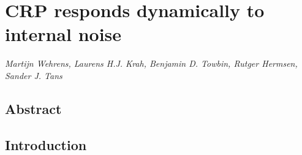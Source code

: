 



% 
%
% 



\chapter{CRP responds dynamically to internal noise}
\label{chapter:CRP}

\textit{Martijn Wehrens, Laurens H.J. Krah, Benjamin D. Towbin, Rutger Hermsen, Sander J. Tans}

\thispagestyle{empty}
\clearpage


\section{Abstract}

\section{Introduction}



